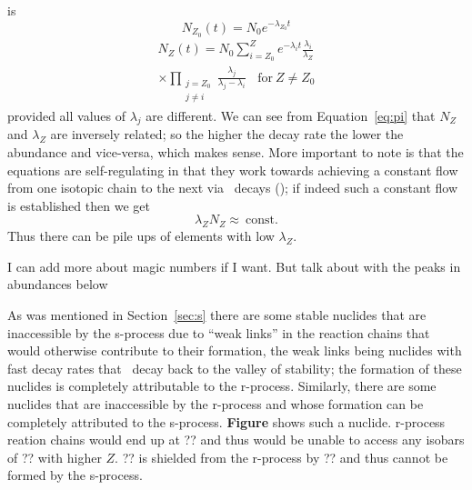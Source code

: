 {\cite{iliadis2008} is
\begin{equation}
N_{Z_0}(t) = N_0 e^{-\lambda_{Z_0} t}
\end{equation}
\begin{multline}
\label{eq:pi}
N_Z(t) = N_0 \sum_{i=Z_0}^Z e^{-\lambda_i
  t}\frac{\lambda_i}{\lambda_Z} \\
\times \prod_{\substack{j=Z_0\\ j\neq i}} \frac{\lambda_j}{\lambda_j -
  \lambda_i}~~~~\textrm{for}~Z\neq Z_0
\end{multline}
provided all values of $\lambda_j$ are different.  
We can see from Equation~\ref{eq:pi} that $N_Z$ and $\lambda_Z$ are
inversely related; so the higher the decay rate the lower the
abundance and vice-versa, which makes sense.  More important to note
is that the equations are self-regulating in that they work towards
achieving a constant flow from one isotopic chain to the next via
\bminus\ decays (\citealt{iliadis2008}); if indeed such a constant
flow is established then we get
\begin{equation}
\lambda_ZN_Z \approx ~ \textrm{const}.
\end{equation}
Thus there can be pile ups of elements with low $\lambda_Z$.

I can add more about magic numbers if I want.  But talk about with the
peaks in abundances below

As was mentioned in Section~\ref{sec:s} there are some stable nuclides
that are inaccessible by the s-process due to ``weak links'' in the
reaction chains that would otherwise contribute to their formation,
the weak links being nuclides with fast decay rates that \bminus\
decay back to the valley of stability; the formation of these nuclides
is completely attributable to the r-process.  Similarly, there are
some nuclides that are inaccessible by the r-process and whose
formation can be completely attributed to the s-process.  {\bf Figure}
shows such a nuclide.  r-process reation chains would end up at ?? and
thus would be unable to access any isobars of ?? with higher $Z$.  ??
is shielded from the r-process by ?? and thus cannot be formed by the
s-process.



}
